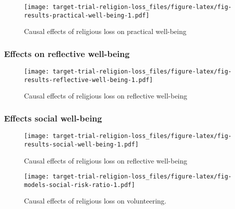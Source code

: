 \documentclass[
  letterpaper,
  DIV=11,
  numbers=noendperiod]{scrartcl}
\begin{document}
\begin{figure}

{\centering \texttt{[image: target-trial-religion-loss\_files/figure-latex/fig-results-practical-well-being-1.pdf]}

}

\caption{\label{fig-results-practical-well-being}Causal effects of
religious loss on practical well-being}

\end{figure}

\hypertarget{effects-on-reflective-well-being}{%
\subsubsection{Effects on reflective
well-being}\label{effects-on-reflective-well-being}}

\begin{figure}

{\centering \texttt{[image: target-trial-religion-loss\_files/figure-latex/fig-results-reflective-well-being-1.pdf]}

}

\caption{\label{fig-results-reflective-well-being}Causal effects of
religious loss on reflective well-being}

\end{figure}

\hypertarget{effects-social-well-being}{%
\subsubsection{Effects social
well-being}\label{effects-social-well-being}}

\begin{figure}

{\centering \texttt{[image: target-trial-religion-loss\_files/figure-latex/fig-results-social-well-being-1.pdf]}

}

\caption{\label{fig-results-social-well-being}Causal effects of
religious loss on reflective well-being}

\end{figure}

\begin{figure}

{\centering \texttt{[image: target-trial-religion-loss\_files/figure-latex/fig-models-social-risk-ratio-1.pdf]}

}

\caption{\label{fig-models-social-risk-ratio}Causal effects of religious
loss on volunteering.}

\end{figure}
\end{document}
